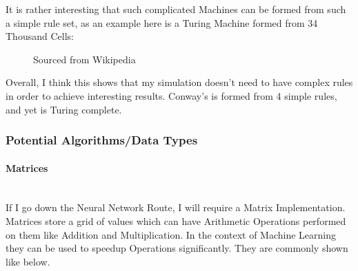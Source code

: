 \begin{flushleft}
                    \vspace{0.2cm}
                    It is rather interesting that such complicated Machines can be formed from such a simple rule set, as an example 
                    here is a Turing Machine formed from 34 Thousand Cells: \\

                    \begin{figure}[h]
                        \centering
                        \caption*{Sourced from Wikipedia}
                    \end{figure}

                    Overall, I think this shows that my simulation doesn't need to have complex rules in order to achieve 
                    interesting results. Conway's is formed from 4 simple rules, and yet is Turing complete.
            \subsubsection{Potential Algorithms/Data Types}
                \large
                \paragraph{Matrices} \mbox{} \\
                    If I go down the Neural Network Route, I will require a Matrix Implementation. Matrices store a grid of 
                    values which can have Arithmetic Operations performed on them like Addition and Multiplication. In the 
                    context of Machine Learning they can be used to speedup Operations significantly. They are commonly shown
                    like below. \\


\end{flushleft}
